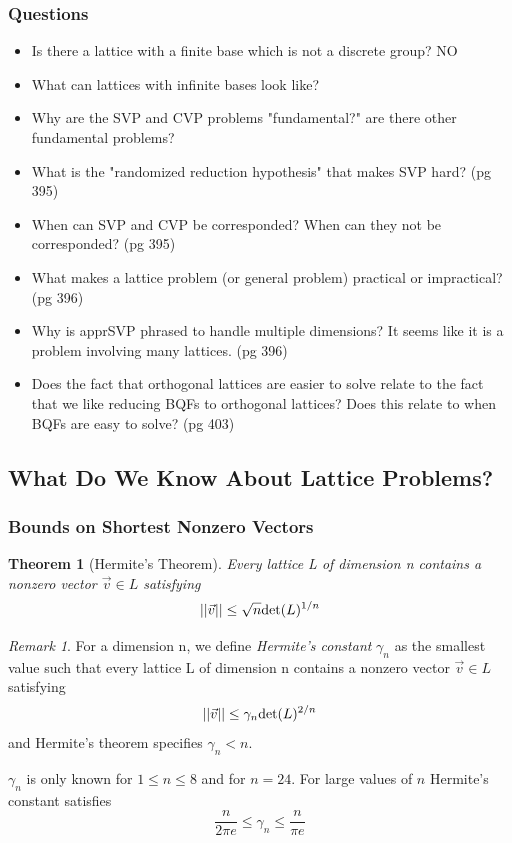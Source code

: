 \documentclass[10pt,a4paper]{article}
\newtheorem*{theorem}{Theorem}
\theoremstyle{remark}
\newtheorem*{remark}{Remark}
\begin{document}
\subsubsection{Questions}
\begin{itemize}
\item Is there a lattice with a finite base which is not a discrete group? NO
\item What can lattices with infinite bases look like?
\item Why are the SVP and CVP problems "fundamental?" are there other fundamental problems?
\item What is the "randomized reduction hypothesis" that makes SVP hard? (pg 395)
\item When can SVP and CVP be corresponded? When can they not be corresponded? (pg 395)
\item What makes a lattice problem (or general problem) practical or impractical? (pg 396)
\item Why is apprSVP phrased to handle multiple dimensions? It seems like it is a problem involving many lattices. (pg 396)
\item Does the fact that orthogonal lattices are easier to solve relate to the fact that we like reducing BQFs to orthogonal lattices? Does this relate to when BQFs are easy to solve? (pg 403)
\end{itemize}

\subsection{What Do We Know About Lattice Problems?}

\subsubsection{Bounds on Shortest Nonzero Vectors}
\begin{theorem}[Hermite's Theorem]
Every lattice L of dimension n contains a nonzero vector $\vec{v}\in L$ satisfying
$$\vert \vert \vec{v} \vert \vert\leq \sqrt{n}\textup{det}(L)^{1/n}$$
\end{theorem}
\begin{remark}
For a dimension n, we define \textit{Hermite's constant} $\gamma_n$ as the smallest value such that every lattice L of dimension n contains a nonzero vector $\vec{v}\in L$ satisfying
$$\vert \vert \vec{v} \vert \vert\leq \gamma_n\textup{det}(L)^{2/n}$$
and Hermite's theorem specifies $\gamma_n<n$.
\end{remark}
$\gamma_n$ is only known for $1\leq n \leq 8$ and for $n=24$.
For large values of $n$ Hermite's constant satisfies
$$\frac{n}{2\pi e} \leq \gamma_n \leq \frac{n}{\pi e}$$
\end{document}
